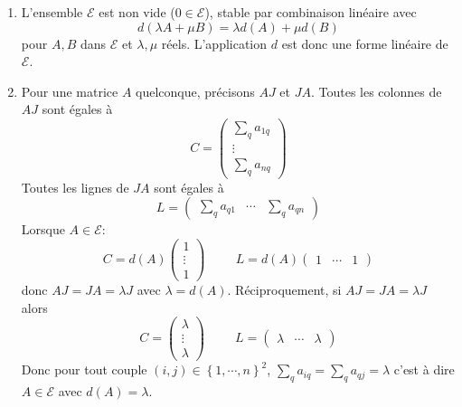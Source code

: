 
\begin{enumerate}
\item  L'ensemble $\mathcal{E}$ est non vide ($0\in \mathcal{E}$), stable par combinaison lin\'{e}aire avec
\begin{displaymath}
d(\lambda A+\mu B)=\lambda d(A)+\mu d(B) 
\end{displaymath}
pour $A,B$ dans $\mathcal{E}$ et $\lambda ,\mu $ r\'{e}els. L'application $d$ est donc une forme lin\'{e}aire de $\mathcal{E}$.

\item  Pour une matrice $A$ quelconque, pr\'{e}cisons $AJ$ et $JA$.\newline
Toutes les colonnes de $AJ$ sont \'{e}gales à
\[
C=
\begin{pmatrix}
\sum_{q}a_{1q} \\ 
\vdots  \\ 
\sum_{q}a_{nq}
\end{pmatrix}
\]
Toutes les lignes de $JA$ sont \'{e}gales à
\[
L=
\begin{pmatrix}
\sum_{q}a_{q1} & \cdots  & \sum_{q}a_{qn}
\end{pmatrix}
\]
Lorsque $A\in \mathcal{E}$:
\begin{displaymath}
 C=d(A) 
\begin{pmatrix}
1 \\ \vdots  \\ 1
\end{pmatrix}
\hspace{1cm}
 L= d(A)
\begin{pmatrix}
1 & \cdots  & 1
\end{pmatrix}
\end{displaymath}
donc $AJ=JA=\lambda J$ avec $\lambda =d(A)$.\newline
R\'{e}ciproquement, si $AJ=JA=\lambda J$ alors
\begin{displaymath}
 C=
\begin{pmatrix}
\lambda  \\ \vdots  \\ \lambda 
\end{pmatrix}
\hspace{1cm} 
L=
\begin{pmatrix}
\lambda  & \cdots  & \lambda 
\end{pmatrix}
\end{displaymath}
Donc pour tout couple $(i,j)\in \left\{ 1,\cdots ,n\right\} ^{2}$, 
$\sum_{q}a_{iq}=\sum_{q}a_{qj}=\lambda $ c'est \`{a} dire $A\in \mathcal{E}$
avec $d(A)=\lambda $.


\end{enumerate}
